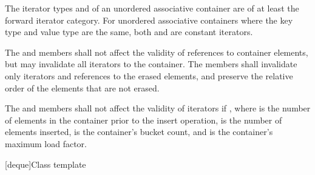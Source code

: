 \documentclass{wg21}
\begin{document}
\pnum
{}%
The iterator types  and  of
an unordered associative container are of at least the forward iterator
category.  For unordered associative containers where the key type and
value type are the same, both  and
 are constant iterators.

\pnum
{}%
The  and  members shall not affect the validity of references to
container elements, but may invalidate all iterators to the
container.  The  members shall invalidate only iterators and
references to the erased elements, and preserve the relative order of the
elements that are not erased.

\pnum
{}%
%
The  and  members shall not affect the validity of iterators if
, where  is the number of elements in
the container prior to the insert operation,  is the
number of elements inserted,  is the container's bucket count, and
 is the container's maximum load factor.



[deque]{Class template }
\end{document}
